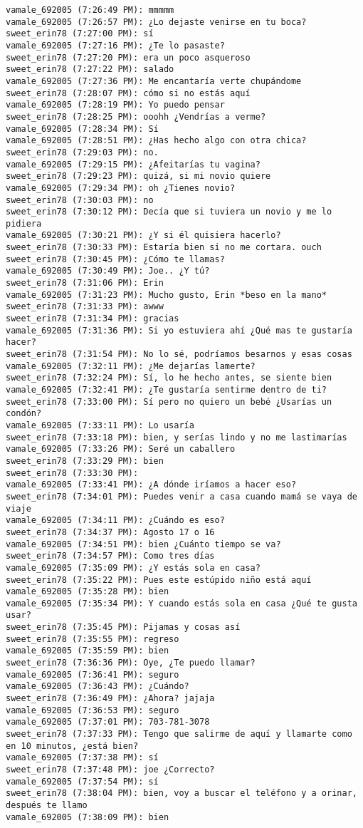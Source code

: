 \begin{verbatim}
vamale_692005 (7:26:49 PM): mmmmm
vamale_692005 (7:26:57 PM): ¿Lo dejaste venirse en tu boca?
sweet_erin78 (7:27:00 PM): sí
vamale_692005 (7:27:16 PM): ¿Te lo pasaste?
sweet_erin78 (7:27:20 PM): era un poco asqueroso
sweet_erin78 (7:27:22 PM): salado
vamale_692005 (7:27:36 PM): Me encantaría verte chupándome
sweet_erin78 (7:28:07 PM): cómo si no estás aquí
vamale_692005 (7:28:19 PM): Yo puedo pensar
sweet_erin78 (7:28:25 PM): ooohh ¿Vendrías a verme?
vamale_692005 (7:28:34 PM): Sí
vamale_692005 (7:28:51 PM): ¿Has hecho algo con otra chica?
sweet_erin78 (7:29:03 PM): no. 
vamale_692005 (7:29:15 PM): ¿Afeitarías tu vagina?
sweet_erin78 (7:29:23 PM): quizá, si mi novio quiere
vamale_692005 (7:29:34 PM): oh ¿Tienes novio?
sweet_erin78 (7:30:03 PM): no
sweet_erin78 (7:30:12 PM): Decía que si tuviera un novio y me lo pidiera
vamale_692005 (7:30:21 PM): ¿Y si él quisiera hacerlo?
sweet_erin78 (7:30:33 PM): Estaría bien si no me cortara. ouch
sweet_erin78 (7:30:45 PM): ¿Cómo te llamas?
vamale_692005 (7:30:49 PM): Joe.. ¿Y tú?
sweet_erin78 (7:31:06 PM): Erin
vamale_692005 (7:31:23 PM): Mucho gusto, Erin *beso en la mano*
sweet_erin78 (7:31:33 PM): awww
sweet_erin78 (7:31:34 PM): gracias
vamale_692005 (7:31:36 PM): Si yo estuviera ahí ¿Qué mas te gustaría hacer?
sweet_erin78 (7:31:54 PM): No lo sé, podríamos besarnos y esas cosas
vamale_692005 (7:32:11 PM): ¿Me dejarías lamerte?
sweet_erin78 (7:32:24 PM): Sí, lo he hecho antes, se siente bien
vamale_692005 (7:32:41 PM): ¿Te gustaría sentirme dentro de ti?
sweet_erin78 (7:33:00 PM): Sí pero no quiero un bebé ¿Usarías un condón?
vamale_692005 (7:33:11 PM): Lo usaría
sweet_erin78 (7:33:18 PM): bien, y serías lindo y no me lastimarías
vamale_692005 (7:33:26 PM): Seré un caballero
sweet_erin78 (7:33:29 PM): bien
sweet_erin78 (7:33:30 PM): 
vamale_692005 (7:33:41 PM): ¿A dónde iríamos a hacer eso?
sweet_erin78 (7:34:01 PM): Puedes venir a casa cuando mamá se vaya de viaje
vamale_692005 (7:34:11 PM): ¿Cuándo es eso?
sweet_erin78 (7:34:37 PM): Agosto 17 o 16
vamale_692005 (7:34:51 PM): bien ¿Cuánto tiempo se va?
sweet_erin78 (7:34:57 PM): Como tres días
vamale_692005 (7:35:09 PM): ¿Y estás sola en casa?
sweet_erin78 (7:35:22 PM): Pues este estúpido niño está aquí
vamale_692005 (7:35:28 PM): bien
vamale_692005 (7:35:34 PM): Y cuando estás sola en casa ¿Qué te gusta usar?
sweet_erin78 (7:35:45 PM): Pijamas y cosas así
sweet_erin78 (7:35:55 PM): regreso
vamale_692005 (7:35:59 PM): bien
sweet_erin78 (7:36:36 PM): Oye, ¿Te puedo llamar?
vamale_692005 (7:36:41 PM): seguro
vamale_692005 (7:36:43 PM): ¿Cuándo?
sweet_erin78 (7:36:49 PM): ¿Ahora? jajaja
vamale_692005 (7:36:53 PM): seguro
vamale_692005 (7:37:01 PM): 703-781-3078
sweet_erin78 (7:37:33 PM): Tengo que salirme de aquí y llamarte como en 10 minutos, ¿está bien?
vamale_692005 (7:37:38 PM): sí
sweet_erin78 (7:37:48 PM): joe ¿Correcto?
vamale_692005 (7:37:54 PM): sí
sweet_erin78 (7:38:04 PM): bien, voy a buscar el teléfono y a orinar, después te llamo
vamale_692005 (7:38:09 PM): bien



\end{verbatim}
